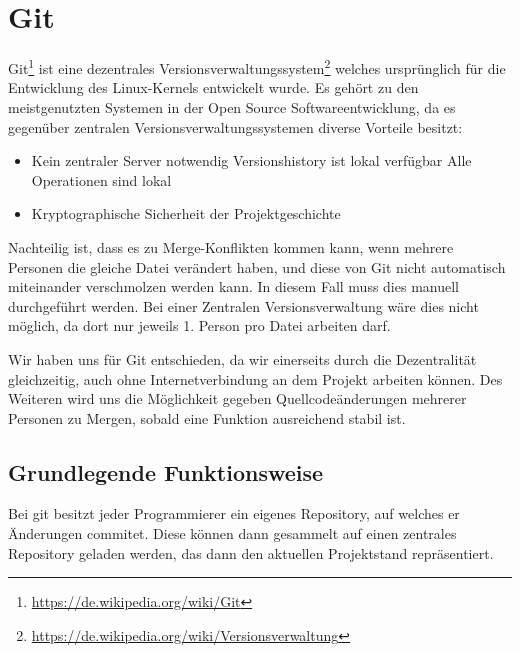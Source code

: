 

\section{Git}

Git\footnote{\url{https://de.wikipedia.org/wiki/Git}} ist eine dezentrales Versionsverwaltungssystem\footnote{\url{https://de.wikipedia.org/wiki/Versionsverwaltung}} welches urspr\"unglich f\"ur die Entwicklung des Linux-Kernels entwickelt wurde. Es geh\"ort zu den meistgenutzten Systemen in der Open Source Softwareentwicklung, da es gegen\"uber zentralen Versionsverwaltungssystemen diverse Vorteile besitzt:

\begin{itemize}
  \item Kein zentraler Server notwendig
  \subitem Versionshistory ist lokal verf\"ugbar
  \subitem Alle Operationen sind lokal
  \item Kryptographische Sicherheit der Projektgeschichte
\end{itemize}

Nachteilig ist, dass es zu Merge-Konflikten kommen kann, wenn mehrere Personen die gleiche Datei ver\"andert haben, und diese von Git nicht automatisch miteinander verschmolzen werden kann. In diesem Fall muss dies manuell durchgef\"uhrt werden. Bei einer Zentralen Versionsverwaltung w\"are dies nicht m\"oglich, da dort nur jeweils 1. Person pro Datei arbeiten darf.

Wir haben uns f\"ur Git entschieden, da wir einerseits durch die Dezentralit\"at gleichzeitig, auch ohne Internetverbindung an dem Projekt arbeiten k\"onnen. Des Weiteren wird uns die M\"oglichkeit gegeben Quellcode\"anderungen mehrerer Personen zu Mergen, sobald eine Funktion ausreichend stabil ist.

\subsection{Grundlegende Funktionsweise}

Bei git besitzt jeder Programmierer ein eigenes Repository, auf welches er \"Anderungen commitet. Diese k\"onnen dann gesammelt auf einen zentrales Repository geladen werden, das dann den aktuellen Projektstand repr\"asentiert.

